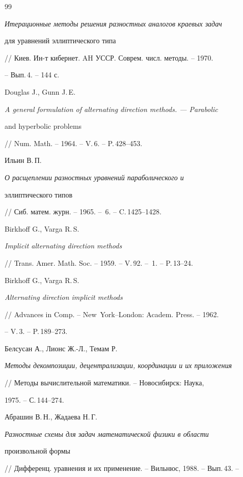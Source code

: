 \begin{thebibliography}{99}
{\it Итерационные методы решения разностных аналогов краевых задач 


для уравнений эллиптического типа}


// Киев. Ин-т кибернет. AH УССР. Соврем. числ. методы. -- 1970.


-- Вып.\,4. -- 144 с.




Douglas J., Gunn J.\,E.


{\it A general formulation of alternating direction methods. --- Parabolic


and hyperbolic problems}


// Num. Math. -- 1964. -- V.\,6. -- P.\,428--453.




Ильин В.\,П.


{\it О расщеплении разностных уравнений параболического и 


эллиптического типов}


// Сиб. матем. журн. -- 1965. -- \No\,6. -- C.\,1425--1428.




Birkhoff G., Varga R.\,S.


{\it Implicit alternating direction methods}


// Trans. Amer. Math. Soc. -- 1959. -- V.\,92. -- \No\,1. -- P.\,13--24.




Birkhoff G., Varga R.\,S.


{\it Alternating direction implicit methods}


// Advances in Comp. -- New~York--London:  Academ. Press. -- 1962.


-- V.\,3. -- P.\,189--273.




Белсусан А., Лионс Ж.-Л., Темам Р.


{\it Методы декомпозиции, децентрализации, координации и их приложения}


// Методы вычислительной математики. -- Новосибирск: Наука, 


1975. -- С.\,144--274.




Абрашин В.\,Н., Жадаева Н.\,Г.


{\it Разностные схемы для задач математической физики в области


произвольной формы}


// Дифференц. уравнения и их применение. -- Вильнюс, 1988. -- Вып.\,43. --



\end{thebibliography}
